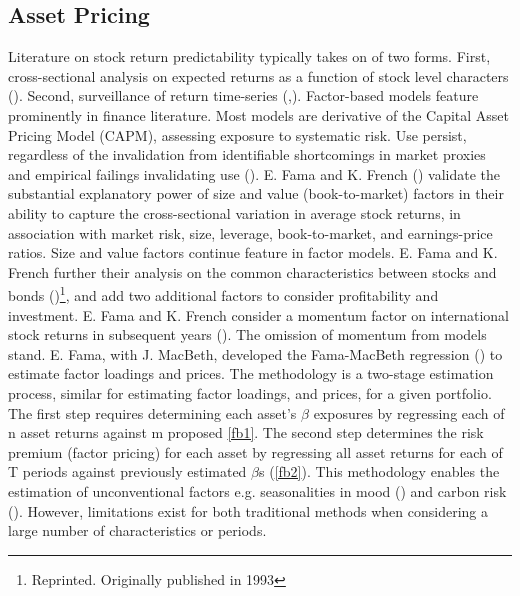 \documentclass[12pt]{article}
\begin{document}
\subsection{Asset Pricing}
Literature on stock return predictability typically takes on of two forms.
First, cross-sectional analysis on expected returns as a function of stock level characters (\cite{fama2008dissecting}).
Second, surveillance of return time-series (\cite{koijen2011predictability},\cite{rapach2013forecasting}).
Factor-based models feature prominently in finance literature.
Most models are derivative of the Capital Asset Pricing Model (CAPM), assessing exposure to systematic risk.
Use persist, regardless of the invalidation from identifiable shortcomings in market proxies and empirical failings invalidating use (\cite{fama2004capital}). E. Fama and K. French (\citeyear{eugene1992cross}) validate the substantial explanatory power of size and value (book-to-market) factors
in their ability to capture the cross-sectional variation in average stock returns, in association with market risk, size, leverage, book-to-market, and earnings-price ratios.
Size and value factors continue feature in factor models.
E. Fama and K. French further their analysis on the common characteristics between stocks and bonds (\cite{fama2021common})\footnote{Reprinted. Originally published in 1993}, 
and add two additional factors to consider profitability and investment.
E. Fama and K. French consider a momentum factor on international stock returns in subsequent years (\cite{fama2012size}).
The omission of momentum from models stand. E. Fama, with J. MacBeth, developed the Fama-MacBeth regression (\cite{fama1973risk}) to estimate factor loadings and prices.
The methodology is a two-stage estimation process, similar for estimating factor loadings, and prices, for a given portfolio.
The first step requires determining each asset's $\beta$ exposures by regressing each of n asset returns against m proposed \ref{fb1}.
The second step determines the risk premium (factor pricing) for each asset by regressing all asset returns for each of T periods against previously estimated $\beta$s (\ref{fb2}).
This methodology enables the estimation of unconventional factors e.g. seasonalities in mood (\cite{hirshleifer2020mood}) and carbon risk (\cite{bolton2021investors}).
However, limitations exist for both traditional methods when considering a large number of characteristics or periods.
\end{document}
